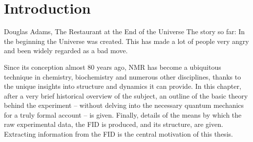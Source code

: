 \chapter{Introduction}

\begin{chapterquote}{Douglas Adams, The Restaurant at the End of the Universe}
    The story so far:
    In the beginning the Universe was created.
    This has made a lot of people very angry and been widely regarded as a bad move.
\end{chapterquote}

Since its conception almost 80 years ago, \ac{NMR} has become a ubiquitous
technique in chemistry, biochemistry and numerous other disciplines, thanks to
the unique insights into structure and dynamics it can provide. In this
chapter, after a very brief historical overview of the subject, an outline of
the basic theory behind the experiment -- without delving into the necessary
quantum mechanics for a truly formal account -- is given. Finally, details of
the means by which the raw experimental data, the \ac*{FID} is produced, and its
structure, are given. Extracting information from the \acs{FID} is the central
motivation of this thesis.



